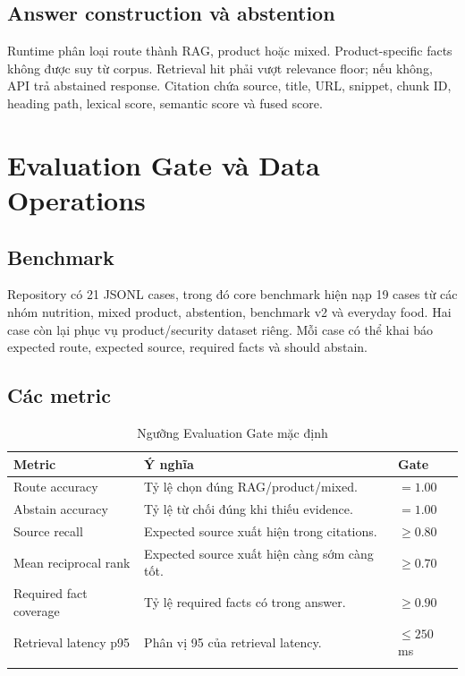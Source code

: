 \documentclass[12pt,a4paper]{report}
\begin{document}
\section{Answer construction và abstention}

Runtime phân loại route thành RAG, product hoặc mixed. Product-specific facts
không được suy từ corpus. Retrieval hit phải vượt relevance floor; nếu không,
API trả abstained response. Citation chứa source, title, URL, snippet, chunk ID,
heading path, lexical score, semantic score và fused score.

\chapter{Evaluation Gate và Data Operations}

\section{Benchmark}

Repository có 21 JSONL cases, trong đó core benchmark hiện nạp 19 cases từ các
nhóm nutrition, mixed product, abstention, benchmark v2 và everyday food. Hai
case còn lại phục vụ product/security dataset riêng. Mỗi case có thể khai báo
expected route, expected source, required facts và should abstain.

\section{Các metric}

\begin{longtable}{p{}p{}p{}}
\toprule
\textbf{Metric} & \textbf{Ý nghĩa} & \textbf{Gate}\\
\midrule
\endhead
Route accuracy & Tỷ lệ chọn đúng RAG/product/mixed. & $=1.00$\\
Abstain accuracy & Tỷ lệ từ chối đúng khi thiếu evidence. & $=1.00$\\
Source recall & Expected source xuất hiện trong citations. & $\geq0.80$\\
Mean reciprocal rank & Expected source xuất hiện càng sớm càng tốt. & $\geq0.70$\\
Required fact coverage & Tỷ lệ required facts có trong answer. & $\geq0.90$\\
Retrieval latency p95 & Phân vị 95 của retrieval latency. & $\leq250$ ms\\
\bottomrule
\caption{Ngưỡng Evaluation Gate mặc định}
\end{longtable}
\end{document}
